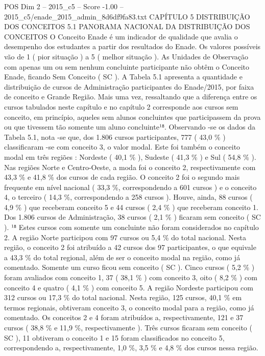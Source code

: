 \begin{textsample}{POS Dim 2 – 2015\_c5 – Score -1.00 – 2015\_c5/enade\_2015\_admin\_8d6df9fa83.txt}  \label{ex:f2_pos_284}
CAPÍTULO 5 DISTRIBUIÇÃO DOS CONCEITOS 5.1 PANORAMA NACIONAL DA DISTRIBUIÇÃO DOS CONCEITOS O Conceito Enade é um indicador de qualidade que avalia o desempenho dos estudantes a partir dos resultados do Enade.
Os valores possíveis vão de 1 ( pior situação ) a 5 ( melhor situação ).
As Unidades de Observação com apenas um ou sem nenhum concluinte participante não obtêm o Conceito Enade, ficando Sem Conceito ( SC ).
A Tabela 5.1 apresenta a quantidade e distribuição de cursos de Administração participantes do Enade/2015, por faixa de conceito e Grande Região.
Mais uma vez, ressaltando que a diferença entre os cursos tabulados neste capítulo e no capítulo 2 corresponde aos cursos sem conceito, em princípio, aqueles sem alunos concluintes que participassem da prova ou que tivessem tão somente um aluno concluinte¹⁸.
Observando -se os dados da Tabela 5.1, nota -se que, dos 1.806 cursos participantes, 777 ( 43,0 \% ) classificaram -se com conceito 3, o valor modal.
Este foi também o conceito modal em três regiões : Nordeste ( 40,1 \% ), Sudeste ( 41,3 \% ) e Sul ( 54,8 \% ).
Nas regiões Norte e Centro-Oeste, a moda foi o conceito 2, respectivamente com 43,3 \% e 41,8 \% dos cursos de cada região.
O conceito 2 foi o segundo mais frequente em nível nacional ( 33,3 \%, correspondendo a 601 cursos ) e o conceito 4, o terceiro ( 14,3 \%, correspondendo a 258 cursos ).
Houve, ainda, 88 cursos ( 4,9 \% ) que receberam conceito 5 e 44 cursos ( 2,4 \% ) que receberam conceito 1.
Dos 1.806 cursos de Administração, 38 cursos ( 2,1 \% ) ficaram sem conceito ( SC ). ¹⁸ Estes cursos com somente um concluinte não foram considerados no capítulo 2.
A região Norte participou com 97 cursos ou 5,4 \% do total nacional.
Nesta região, o conceito 2 foi atribuído a 42 cursos dos 97 participantes, o que equivale a 43,3 \% do total regional, além de ser o conceito modal na região, como já comentado.
Somente um curso ficou sem conceito ( SC ).
Cinco cursos ( 5,2 \% ) foram avaliados com conceito 1, 37 ( 38,1 \% ) com conceito 3, oito ( 8,2 \% ) com conceito 4 e quatro ( 4,1 \% ) com conceito 5.
A região Nordeste participou com 312 cursos ou 17,3 \% do total nacional.
Nesta região, 125 cursos, 40,1 \% em termos regionais, obtiveram conceito 3, o conceito modal para a região, como já comentado.
Os conceitos 2 e 4 foram atribuídos a, respectivamente, 121 e 37 cursos ( 38,8 \% e 11,9 \%, respectivamente ).
Três cursos ficaram sem conceito ( SC ), 11 obtiveram o conceito 1 e 15 foram classificados no conceito 5, correspondendo a, respectivamente, 1,0 \%, 3,5 \% e 4,8 \% dos cursos nessa região.

\end{textsample}

